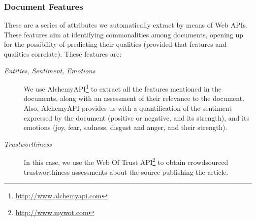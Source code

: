 \documentclass{llncs}
\begin{document}
\subsubsection{Document Features} These are a series of attributes we automatically extract by means of Web APIs. These features aim at identifying commonalities among documents, opening up for the possibility of predicting their qualities (provided that features and qualities correlate). These features are:
%
%
%
\begin{description}
\item[{\it Entities, Sentiment, Emotions}] We use AlchemyAPI\footnote{\url{http://www.alchemyapi.com}} to extract all the features mentioned in the documents, along with an assessment of their relevance to the document. Also, AlchemyAPI provides us with a quantification of the sentiment expressed by the document (positive or negative, and its strength), and its emotions (joy, fear, sadness, disgust and anger, and their strength).
\item[{\it Trustworthiness}] In this case, we use the Web Of Trust API\footnote{\url{http://www.mywot.com}} to obtain crowdsourced trustworthiness assessments about the source publishing the article.
%
%
%
%
%
%
\end{description}
\end{document}
